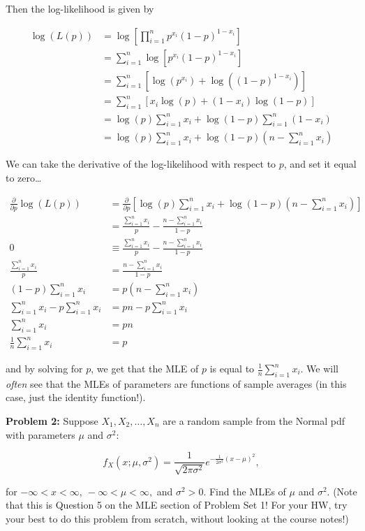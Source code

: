 \documentclass[
  letterpaper,
  DIV=11,
  numbers=noendperiod]{scrreprt}
\begin{document}
Then the log-likelihood is given by

\begin{align*} 
\log(L(p)) & = \log \left[ \prod_{i = 1}^n p^{x_i} (1-p)^{1 - x_i} \right] \\ 
& = \sum_{i = 1}^n \log \left[p^{x_i} (1-p)^{1 - x_i} \right] \\
& = \sum_{i = 1}^n \left[ \log(p^{x_i}) + \log((1-p)^{1-x_i}) \right] \\
& = \sum_{i = 1}^n \left[ x_i \log(p) + (1 - x_i) \log(1-p) \right] \\
& = \log(p)\sum_{i = 1}^n x_i  + \log(1-p) \sum_{i = 1}^n (1 - x_i)  \\
& = \log(p)\sum_{i = 1}^n x_i  + \log(1-p)  (n - \sum_{i = 1}^n x_i)
\end{align*}

We can take the derivative of the log-likelihood with respect to \(p\),
and set it equal to zero\ldots{}

\begin{align*} 
\frac{\partial}{\partial p} \log(L(p)) & = \frac{\partial}{\partial p} \left[ \log(p)\sum_{i = 1}^n x_i  + \log(1-p)  (n - \sum_{i = 1}^n x_i) \right] \\
& = \frac{\sum_{i = 1}^n x_i }{p} - \frac{n - \sum_{i = 1}^n x_i}{1-p} \\
0 & \equiv \frac{\sum_{i = 1}^n x_i }{p} - \frac{n - \sum_{i = 1}^n x_i}{1-p} \\
\frac{\sum_{i = 1}^n x_i }{p}  & = \frac{n - \sum_{i = 1}^n x_i}{1-p} \\
(1-p) \sum_{i = 1}^n x_i & = p (n - \sum_{i = 1}^n x_i) \\
\sum_{i = 1}^n x_i - p\sum_{i = 1}^n x_i & = pn - p \sum_{i = 1}^n x_i \\
\sum_{i = 1}^n x_i & = pn \\
\frac{1}{n} \sum_{i = 1}^n x_i & = p
\end{align*}

and by solving for \(p\), we get that the MLE of \(p\) is equal to
\(\frac{1}{n}\sum_{i = 1}^n x_i\). We will \emph{often} see that the
MLEs of parameters are functions of sample averages (in this case, just
the identity function!).

\textbf{Problem 2:} Suppose \(X_1, X_2, \dots, X_n\) are a random sample
from the Normal pdf with parameters \(\mu\) and \(\sigma^2\):

\[
f_X(x ; \mu, \sigma^2) = \frac{1}{\sqrt{2\pi\sigma^2}}e^{-\frac{1}{2\sigma^2}(x-\mu)^2},
\]

for \(-\infty < x < \infty, \ -\infty < \mu < \infty,\) and
\(\sigma^2 > 0\). Find the MLEs of \(\mu\) and \(\sigma^2\). (Note that
this is Question 5 on the MLE section of Problem Set 1! For your HW, try
your best to do this problem from scratch, without looking at the course
notes!)
\end{document}
